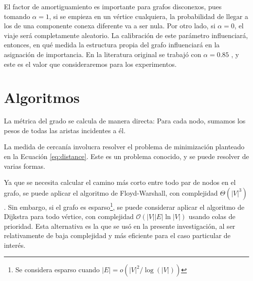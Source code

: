 \documentclass[journal]{IEEEtran}
\begin{document}
El factor de amortiguamiento es importante para grafos disconexos, pues tomando \(\alpha = 1\), si se empieza en un vértice cualquiera, la probabilidad de llegar a los de una componente conexa diferente va a ser nula. Por otro lado, si \(\alpha = 0\), el viaje será completamente aleatorio. La calibración de este parámetro influenciará, entonces, en qué medida la estructura propia del grafo influenciará en la asignación de importancia. En la literatura original se trabajó con \(\alpha = 0.85\) \cite{google}, y este es el valor que consideraremos para los experimentos.

\section{Algoritmos}

La métrica del grado se calcula de manera directa: Para cada nodo, sumamos los pesos de todas las aristas incidentes a él.

La medida de cercanía involucra resolver el problema de minimización planteado en la Ecuación \ref{eq:distance}. Este es un problema conocido, y se puede resolver de varias formas.

Ya que se necesita calcular el camino más corto entre todo par de nodos en el grafo, se puede aplicar el algoritmo de Floyd-Warshall, con complejidad \(\Theta(|V|^3)\) \cite{clrs}. Sin embargo, si el grafo es esparso\footnote{Se considera esparso cuando \(|E| = o(|V|^2 / \log(|V|))\)\cite{clrs}}, se puede considerar aplicar el algoritmo de Dijkstra para todo vértice, con complejidad \(\mathcal{O}(|V||E|\ln |V|)\) usando colas de prioridad. Esta alternativa es la que se usó en la presente investigación, al ser relativamente de baja complejidad y más eficiente para el caso particular de interés.
\end{document}
